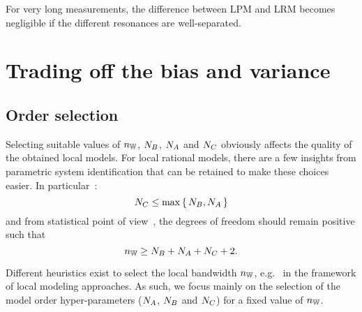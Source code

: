 \begin{guideline}
For very long measurements, the difference between \gls{LPM} and \gls{LRM} becomes negligible if the different resonances are well-separated.
\end{guideline}


\section{Trading off the bias and variance}

\subsection{Order selection}
\label{sec:nparam:orderSelection}
Selecting suitable values of $n_{\mathbb{W}}$, $N_{B}$, $N_{A}$ and $N_{C}$ obviously affects the quality of the obtained local models.
For local rational models, there are a few insights from parametric system identification that can be retained to make these choices easier.
In particular~\citep{Pintelon2010LPM1}:
\begin{equation}
N_{C} \leq \max\set{\ensuremath{N_{B}},\ensuremath{N_{A}}}
\end{equation}
 and from statistical point of view~\citep{Mahata2006}, the degrees of freedom should remain positive such that 
 \begin{equation}
 n_{\mathbb{W}} \geq N_{B} + N_{A} + N_{C} + 2
 \text{.}
 \end{equation}
 
Different heuristics exist to select the local bandwidth $n_{\mathbb{W}}$, e.g.~\citet{Fan1995,Thummala2012LPMBW,Stenman2000ASETFE} in the framework of local modeling approaches.
As such, we focus mainly on the selection of the model order hyper-parameters ($N_{A}$, $N_{B}$ and $N_{C}$) for a fixed value of $n_{\mathbb{W}}$.

